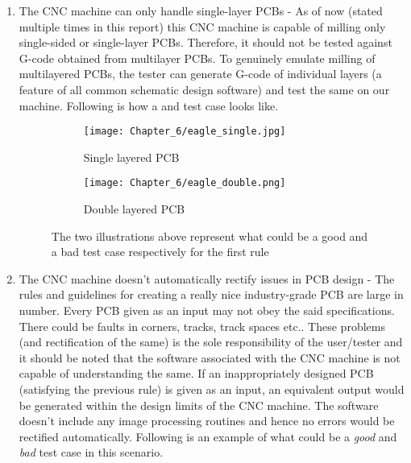 \begin{enumerate}
    \item The CNC machine can only handle single-layer PCBs - As of now (stated multiple times in this report) this CNC machine is capable of milling only single-sided or single-layer PCBs. Therefore, it should not be tested against G-code obtained from multilayer PCBs. To genuinely emulate milling of multilayered PCBs, the tester can generate G-code of individual layers (a feature of all common schematic design software) and test the same on our machine. Following is how a  and  test case looks like.

    \begin{figure}[h]

    \begin{subfigure}{0.5\textwidth}
    \hspace{8mm}
        \texttt{[image: Chapter\_6/eagle\_single.jpg]}
        \caption{Single layered PCB}
        \label{fig:slpcb}
    \end{subfigure}
    \begin{subfigure}{0.5\textwidth}
    \hspace{8mm}
        \texttt{[image: Chapter\_6/eagle\_double.png]}
        \caption{Double layered PCB}
        \label{fig:dlpcb}
    \end{subfigure}

    \caption{The two illustrations above represent what could be a good and a bad test case respectively for the first rule}
    \label{fig:sl_dl_pcb}
    \end{figure} 
    
    \item The CNC machine doesn’t automatically rectify issues in PCB design - The rules and guidelines for creating a really nice industry-grade PCB are large in number. Every PCB given as an input may not obey the said specifications. There could be faults in corners, tracks, track spaces etc.. These problems (and rectification of the same) is the sole responsibility of the user/tester and it should be noted that the software associated with the CNC machine is not capable of understanding the same. If an inappropriately designed PCB (satisfying the previous rule) is given as an input, an equivalent output would be generated within the design limits of the CNC machine. The software doesn’t include any image processing routines and hence no errors would be rectified automatically. Following is an example of what could be a \textit{good} and \textit{bad} test case in this scenario.
    

\end{enumerate}
